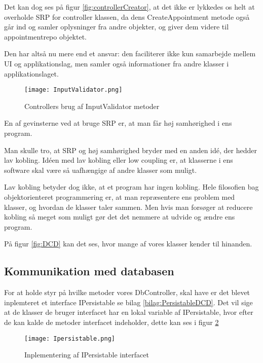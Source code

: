 Det kan dog ses på figur \ref{fig:controllerCreator}, at det ikke er lykkedes os helt at overholde SRP for controller klassen, da dens CreateAppointment metode også går ind og samler oplysninger fra andre objekter, og giver dem videre til appointmentrepo objektet.

Den har altså nu mere end et ansvar: den faciliterer ikke kun samarbejde mellem UI og applikationslag, men samler også informationer fra andre klasser i applikationslaget.

\begin{figure}[h]
    \caption{Controllers brug af InputValidator metoder}
    \centering
        \texttt{[image: InputValidator.png]}
    \label{fig:InputValidator}
\end{figure}

En af gevinsterne ved at bruge SRP er, at man får høj samhørighed i ens program.

Man skulle tro, at SRP og høj samhørighed bryder med en anden idé, der hedder lav kobling.     
Idéen med lav kobling eller low coupling er, at klasserne i ens software skal være så uafhængige af andre klasser som muligt.

Lav kobling betyder dog ikke, at et program har ingen kobling.
Hele filosofien bag objektorienteret programmering er, at man repræsentere ens problem med klasser, og hvordan de klasser taler sammen.
Men hvis man forsøger at reducere kobling så meget som muligt gør det det nemmere at udvide og ændre ens program.

På figur \ref{fig:DCD} kan det ses, hvor mange af vores klasser kender til hinanden.

\subsection{Kommunikation med databasen}

For at holde styr på hvilke metoder vores DbController, skal have er det blevet inplemteret et interface IPersistable se bilag \ref{bilag:PersistableDCD}.
Det vil sige at de klasser de bruger interfacet har en lokal variable af IPersistable, hvor efter de kan kalde de metoder interfacet indeholder, dette kan ses i figur \ref{fig:Persistable}

\begin{figure}[h]
    \caption{Inplementering af IPersistable interfacet}
    \centering
        \texttt{[image: Ipersistable.png]}
    \label{fig:Persistable}
\end{figure}

